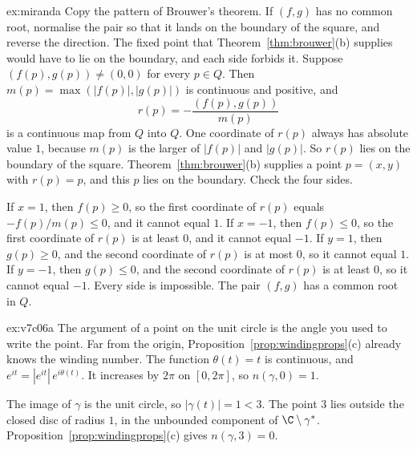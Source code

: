 \begin{solution}{ex:miranda}
\idea Copy the pattern of Brouwer's theorem. If $(f,g)$ has no common root, normalise the pair so that it lands on the boundary of the square, and reverse the direction. The fixed point that Theorem~\ref{thm:brouwer}(b) supplies would have to lie on the boundary, and each side forbids it.
\writeup Suppose $(f(p),g(p))\ne(0,0)$ for every $p\in Q$. Then $m(p)=\max(|f(p)|,|g(p)|)$ is continuous and positive, and
\[
r(p)=-\frac{(f(p),g(p))}{m(p)}
\]
is a continuous map from $Q$ into $Q$. One coordinate of $r(p)$ always has absolute value $1$, because $m(p)$ is the larger of $|f(p)|$ and $|g(p)|$. So $r(p)$ lies on the boundary of the square. Theorem~\ref{thm:brouwer}(b) supplies a point $p=(x,y)$ with $r(p)=p$, and this $p$ lies on the boundary. Check the four sides.

If $x=1$, then $f(p)\ge0$, so the first coordinate of $r(p)$ equals $-f(p)/m(p)\le0$, and it cannot equal $1$. If $x=-1$, then $f(p)\le0$, so the first coordinate of $r(p)$ is at least $0$, and it cannot equal $-1$. If $y=1$, then $g(p)\ge0$, and the second coordinate of $r(p)$ is at most $0$, so it cannot equal $1$. If $y=-1$, then $g(p)\le0$, and the second coordinate of $r(p)$ is at least $0$, so it cannot equal $-1$. Every side is impossible. The pair $(f,g)$ has a common root in $Q$.
\end{solution}

\begin{solution}{ex:v7c06a}
\idea The argument of a point on the unit circle is the angle you used to write the point. Far from the origin, Proposition~\ref{prop:windingprops}(c) already knows the winding number.
\writeup The function $\theta(t)=t$ is continuous, and $e^{it}=|e^{it}|\,e^{i\theta(t)}$. It increases by $2\pi$ on $[0,2\pi]$, so $n(\gamma,0)=1$.

The image of $\gamma$ is the unit circle, so $|\gamma(t)|=1<3$. The point $3$ lies outside the closed disc of radius $1$, in the unbounded component of $\C\setminus\gamma^*$. Proposition~\ref{prop:windingprops}(c) gives $n(\gamma,3)=0$.
\end{solution}

